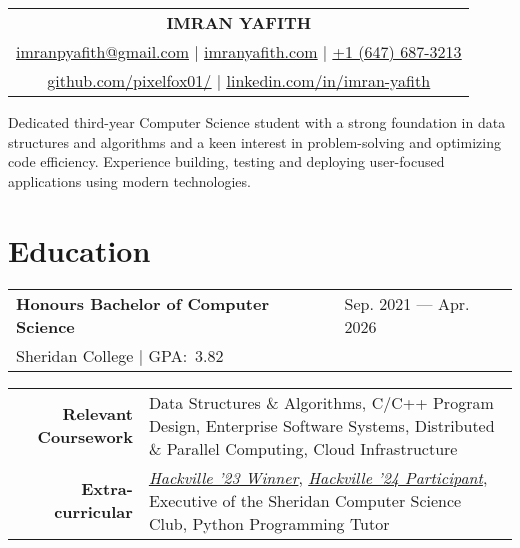 \documentclass[a4paper, 12pt]{article}
\begin{document}
\color{regtextgray} %
\pagestyle{empty} %

\begin{tabularx}{\linewidth}{@{} C @{}}
    \textcolor{imptextblack}{\Huge{\textbf{IMRAN YAFITH}}}                                    \\[6pt]
    \underline{\href{mailto:imranpyafith@gmail.com}{\raisebox{-0.05\height}{\faEnvelope} imranpyafith@gmail.com}} $|$
    \underline{\href{https://imranyafith.com/}{\raisebox{-0.05\height}{\faGlobe} imranyafith.com}} $|$
    \underline{\href{tel:+16476873213}{\raisebox{-0.05\height}{\faMobile} +1 (647) 687-3213}} \\
    \underline{\href{https://github.com/pixelfox01}{\raisebox{-0.05\height}{\faGithub} github.com/pixelfox01/}} $|$
    \underline{\href{https://www.linkedin.com/in/imran-yafith-95a437266/}{\raisebox{-0.05\height}{\faLinkedin} linkedin.com/in/imran-yafith}}
\end{tabularx}

\begin{center}
    \fontsize{11pt}{12pt}\selectfont
    Dedicated third-year Computer Science student with a strong foundation in data structures and algorithms and a keen interest in problem-solving and optimizing code efficiency.
    Experience building, testing and deploying user-focused applications using modern technologies.
\end{center}

\section{Education}
\begin{tabularx}{\linewidth}{ @{}l X@{} }
    \textcolor{imptextblack}{\textbf{Honours Bachelor of Computer Science}} & \hfill Sep. 2021 --- Apr. 2026 \\
    \small{Sheridan College $|$ GPA:\ 3.82}
\end{tabularx}
\begin{center}
    \begin{tabular}{@{} r @{\hspace{2em}} p{} @{}}
        \textcolor{imptextblack}{\textbf{Relevant Coursework}} & Data Structures \& Algorithms, C/C++ Program Design, Enterprise Software Systems, Distributed \& Parallel Computing, Cloud Infrastructure                                                                                                             \\
        \textcolor{imptextblack}{\textbf{Extra-curricular}}    & \href{https://devpost.com/software/cybernexus}{\textit{Hackville '23 Winner}}, \href{https://devpost.com/software/pitchperfect-teu3zs}{\textit{Hackville '24 Participant}}, Executive of the Sheridan Computer Science Club, Python Programming Tutor \\
    \end{tabular}
\end{center}
\end{document}
